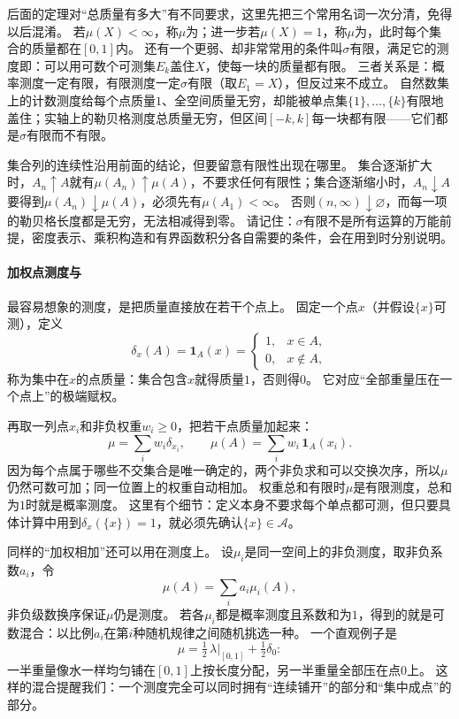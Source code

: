 后面的定理对“总质量有多大”有不同要求，这里先把三个常用名词一次分清，免得以后混淆。
若$\mu(X)<\infty$，称$\mu$为；进一步若$\mu(X)=1$，称$\mu$为，此时每个集合的质量都在$[0,1]$内。
还有一个更弱、却非常常用的条件叫$\sigma$有限，满足它的测度即：可以用可数个可测集$E_k$盖住$X$，使每一块的质量都有限。
三者关系是：概率测度一定有限，有限测度一定$\sigma$有限（取$E_1=X$），但反过来不成立。
自然数集上的计数测度给每个点质量$1$、全空间质量无穷，却能被单点集$\{1\},\ldots,\{k\}$有限地盖住；实轴上的勒贝格测度总质量无穷，但区间$[-k,k]$每一块都有限——它们都是$\sigma$有限而不有限。

集合列的连续性沿用前面的结论，但要留意有限性出现在哪里。
集合逐渐扩大时，$A_n\uparrow A$就有$\mu(A_n)\uparrow\mu(A)$，不要求任何有限性；集合逐渐缩小时，$A_n\downarrow A$要得到$\mu(A_n)\downarrow\mu(A)$，必须先有$\mu(A_1)<\infty$。
否则$(n,\infty)\downarrow\varnothing$，而每一项的勒贝格长度都是无穷，无法相减得到零。
请记住：$\sigma$有限不是所有运算的万能前提，密度表示、乘积构造和有界函数积分各自需要的条件，会在用到时分别说明。

\paragraph{加权点测度与}

最容易想象的测度，是把质量直接放在若干个点上。
固定一个点$x$（并假设$\{x\}$可测），定义
\[
 \delta_x(A)=\mathbf 1_A(x)=
 \begin{cases}1,&x\in A,\\0,&x\notin A,\end{cases}
\]
称为集中在$x$的点质量：集合包含$x$就得质量$1$，否则得$0$。
它对应“全部重量压在一个点上”的极端赋权。

再取一列点$x_i$和非负权重$w_i\geq0$，把若干点质量加起来：
\[
 \mu=\sum_i w_i\delta_{x_i},\qquad
 \mu(A)=\sum_i w_i\,\mathbf 1_A(x_i).
\]
因为每个点属于哪些不交集合是唯一确定的，两个非负求和可以交换次序，所以$\mu$仍然可数可加；同一位置上的权重自动相加。
权重总和有限时$\mu$是有限测度，总和为$1$时就是概率测度。
这里有个细节：定义本身不要求每个单点都可测，但只要具体计算中用到$\delta_x(\{x\})=1$，就必须先确认$\{x\}\in\mathcal A$。

同样的“加权相加”还可以用在测度上。
设$\mu_i$是同一空间上的非负测度，取非负系数$a_i$，令
\[
 \mu(A)=\sum_i a_i\mu_i(A),
\]
非负级数换序保证$\mu$仍是测度。
若各$\mu_i$都是概率测度且系数和为$1$，得到的就是可数混合：以比例$a_i$在第$i$种随机规律之间随机挑选一种。
一个直观例子是
\[
 \mu=\tfrac12\,\lambda|_{[0,1]}+\tfrac12\delta_0:
\]
一半重量像水一样均匀铺在$[0,1]$上按长度分配，另一半重量全部压在点$0$上。
这样的混合提醒我们：一个测度完全可以同时拥有“连续铺开”的部分和“集中成点”的部分。

